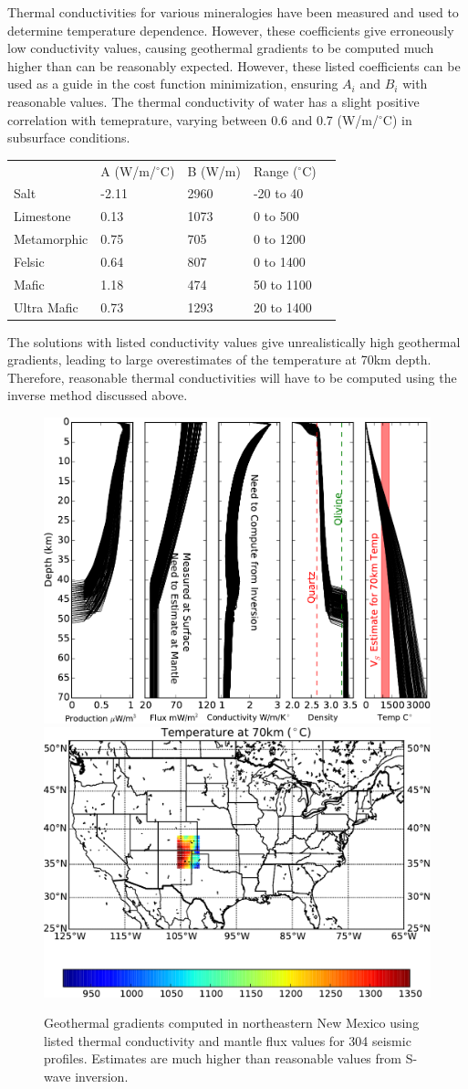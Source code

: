 \documentclass[a4paper,10pt]{article}
\begin{document}
Thermal conductivities for various mineralogies have been measured and used to determine  temperature dependence.  However, these coefficients give erroneously low conductivity values, causing geothermal gradients to be computed much higher than can be reasonably expected. However, these listed coefficients can be used as a guide in the cost function minimization, ensuring $A_i$ and $B_i$ with reasonable values. The thermal conductivity of water has a slight positive correlation with temeprature, varying between 0.6 and 0.7 (W/m/$^{\circ}$C) in subsurface conditions.   \\
  
\centering
\label{my-label}
\begin{tabular}{lllll}
            & A   (W/m/$^{\circ}$C)   & B  (W/m)   & Range  ($^{\circ}$C) &  \\
Salt        & -2.11 & 2960 & -20  to  40\\
Limestone   & 0.13  & 1073 & 0   to 500 \\
Metamorphic & 0.75  & 705  & 0 to 1200 \\
Felsic      & 0.64  & 807  & 0   to 1400 \\
Mafic       & 1.18  & 474  & 50 to 1100 \\
Ultra Mafic & 0.73  & 1293 & 20 to 1400           
\end{tabular}
  \justify
  
 The solutions with listed conductivity values give unrealistically high geothermal gradients, leading to large overestimates of the temperature at 70km depth. Therefore, reasonable thermal conductivities will have to be computed using the inverse method discussed above. 
 
 
 \begin{figure}
 \centering
 \includegraphics[width=.45\textwidth]{HeatFluxProd-crop.pdf} 
  \includegraphics[width=.52\textwidth]{Temp70Seismic-crop.pdf} 
 \caption{Geothermal gradients computed in northeastern New Mexico using listed thermal conductivity and mantle flux values for 304 seismic profiles. Estimates are much higher than reasonable values from S-wave inversion.  }
 \end{figure}
\end{document}
